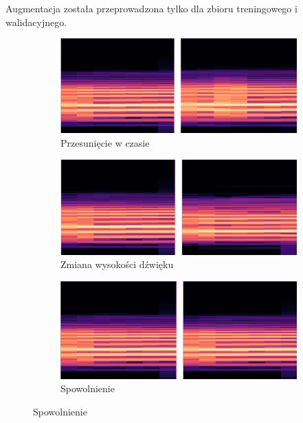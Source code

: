 Augmentacja została przeprowadzona tylko dla zbioru treningowego i walidacyjnego.

\begin{figure}[ht]
    \centering
    \begin{subfigure}{0.7\textwidth}
        \includegraphics[width=\linewidth]{./img/augmentation/rolled}
        \caption{Przesunięcie w czasie\@}
        \label{fig:roll}
    \end{subfigure}

    \begin{subfigure}{0.7\textwidth}
        \includegraphics[width=\linewidth]{./img/augmentation/pitch}
        \caption{Zmiana wysokości dźwięku\@}
        \label{fig:pitch}
    \end{subfigure}

    \begin{subfigure}{0.7\textwidth}
        \includegraphics[width=\linewidth]{./img/augmentation/slow}
        \caption{Spowolnienie\@}
        \label{fig:slow}
    \end{subfigure}


\end{figure}
